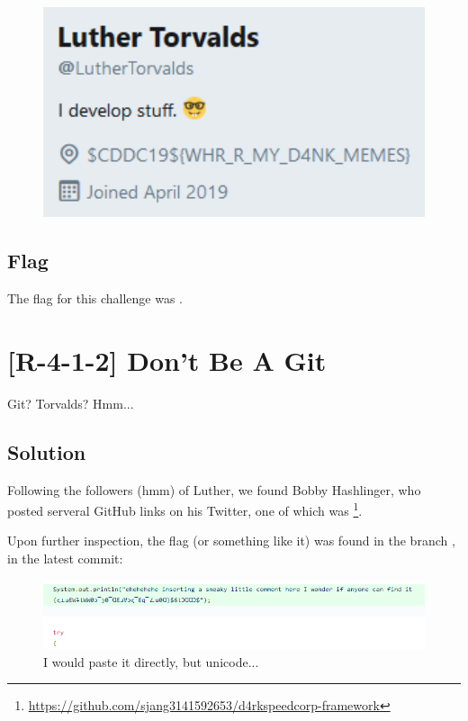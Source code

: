 		\begin{figure}[!htbp]\centering
			\includegraphics[width=130mm]{figures/osintred/r41.png} \vspace{5mm}
		\end{figure}


	\subsection{Flag}
		The flag for this challenge was .



\pagebreak
\section{[R-4-1-2] Don't Be A Git}

	Git? Torvalds? Hmm...

	\subsection{Solution}

		Following the followers (hmm) of Luther, we found Bobby Hashlinger, who posted serveral GitHub links on his
		Twitter, one of which was
		\footnote{\url{https://github.com/sjang3141592653/d4rkspeedcorp-framework}}.

		Upon further inspection, the flag (or something like it) was found in the branch , in
		the latest commit:

		\begin{figure}[!htbp]\centering
			\includegraphics[width=130mm]{figures/osintred/r412.png} \vspace{5mm}
			\caption{I would paste it directly, but unicode...}
		\end{figure}

